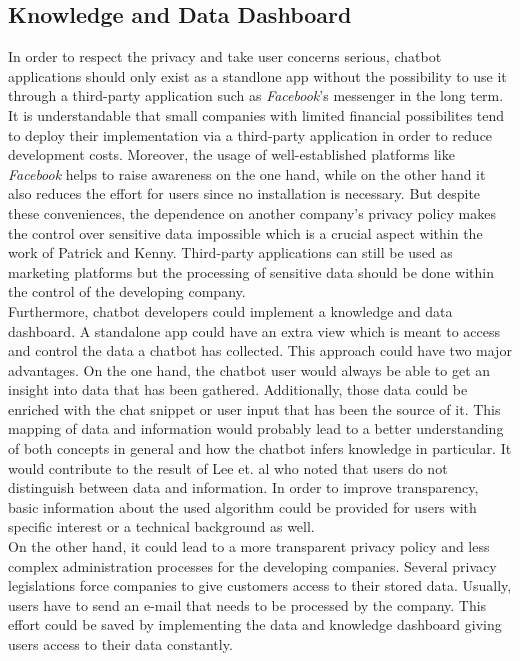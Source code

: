 \documentclass[sigconf, nonacm]{acmart}
\begin{document}
\subsection{Knowledge and Data Dashboard}
\label{sec:four_one}
In order to respect the privacy and take user concerns serious, chatbot applications should only exist as a standlone app without the possibility to use it through a third-party application such as \emph{Facebook}'s messenger in the long term. It is understandable that small companies with limited
financial possibilites tend to deploy their implementation via a third-party application in order to reduce development costs. Moreover, the usage of well-established platforms like \emph{Facebook} helps to raise awareness on the one hand, while on the other hand it also reduces the effort for users since no installation is necessary. 
But despite these conveniences, the dependence on another company's privacy policy makes the control over sensitive data impossible which is a crucial aspect within the 
work of Patrick and Kenny\cite{Patrick2003}. Third-party applications can still be used as marketing platforms but the processing of sensitive data should be done within the control of the developing company.
\\
Furthermore, chatbot developers could implement a knowledge and data dashboard. A standalone app could have an extra view which is meant to access and control the data a chatbot has collected.
This approach could have two major advantages. On the one hand, the chatbot user would always be able to get an insight into data that has been gathered. Additionally, those data could be enriched with the chat snippet or user input that has been the source of it. 
This mapping of data and information would probably lead to a better understanding of both concepts in general and how the chatbot infers knowledge in particular. It would contribute to the result of Lee et. al \cite{Lee2011} who noted that users do not distinguish between data and information.
In order to improve transparency, basic information about the used algorithm could be provided for users with specific interest or a technical background as well.
\\
On the other hand, it could lead to a more transparent privacy policy and less complex administration processes for the developing companies. Several privacy legislations force companies to give customers access to their stored data. Usually, users have to send an e-mail that needs to be processed by the company. This effort could be saved by
implementing the data and knowledge dashboard giving users access to their data constantly.
\end{document}
